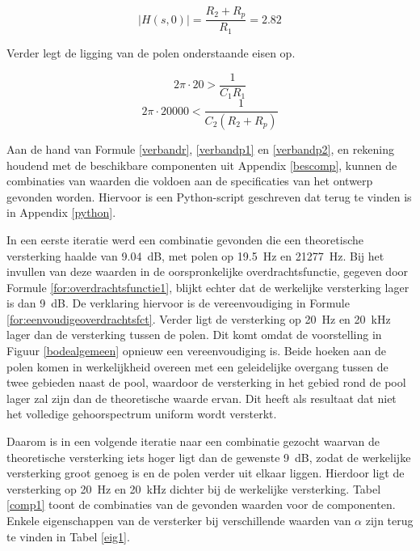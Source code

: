 \documentclass{report}
\begin{document}
\begin{equation}
    \lvert H(s,0) \rvert = \frac{R_2+R_p}{R_1} = 2.82
    \label{verbandr}
\end{equation}

Verder legt de ligging van de polen onderstaande eisen op.

\begin{equation}
    2\pi\cdot20 > \frac{1}{C_1R_1}
    \label{verbandp1}
\end{equation}
\begin{equation}
    2\pi\cdot20000 < \frac{1}{C_2(R_2+R_p)}
    \label{verbandp2}
\end{equation}

Aan de hand van Formule \ref{verbandr}, \ref{verbandp1} en \ref{verbandp2}, en rekening houdend met de beschikbare componenten uit Appendix \ref{bescomp}, kunnen de combinaties van waarden die voldoen aan de specificaties van het ontwerp gevonden worden. Hiervoor is een Python-script geschreven dat terug te vinden is in Appendix \ref{python}.

In een eerste iteratie werd een combinatie gevonden die een theoretische versterking haalde van \SI{9.04}{\deci\bel}, met polen op \SI{19.5}{\hertz} en \SI{21277}{\hertz}. Bij het invullen van deze waarden in de oorspronkelijke overdrachtsfunctie, gegeven door Formule \ref{for:overdrachtsfunctie1}, blijkt echter dat de werkelijke versterking lager is dan \SI{9}{\deci\bel}. De verklaring hiervoor is de vereenvoudiging in Formule \ref{for:eenvoudigeoverdrachtsfct}. Verder ligt de versterking op \SI{20}{\hertz} en \SI{20}{\kilo\hertz} lager dan de versterking tussen de polen. Dit komt omdat de voorstelling in Figuur \ref{bodealgemeen} opnieuw een vereenvoudiging is. Beide hoeken aan de polen komen in werkelijkheid overeen met een geleidelijke overgang tussen de twee gebieden naast de pool, waardoor de versterking in het gebied rond de pool lager zal zijn dan de theoretische waarde ervan. Dit heeft als resultaat dat niet het volledige gehoorspectrum uniform wordt versterkt.

Daarom is in een volgende iteratie naar een combinatie gezocht waarvan de theoretische versterking iets hoger ligt dan  de gewenste \SI{9}{\deci\bel}, zodat de werkelijke versterking groot genoeg is en de polen verder uit elkaar liggen. Hierdoor ligt de versterking op \SI{20}{\hertz} en \SI{20}{\kilo\hertz} dichter bij de werkelijke versterking. Tabel \ref{comp1} toont de combinaties van de gevonden waarden voor de componenten. Enkele eigenschappen van de versterker bij verschillende waarden van $\alpha$ zijn terug te vinden in Tabel \ref{eig1}.
\end{document}
